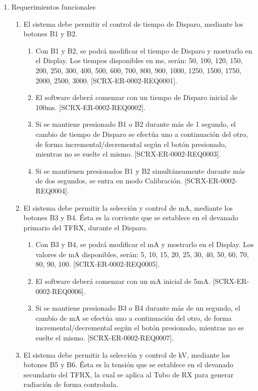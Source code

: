 \documentclass[
11pt, %
]{charter}
\begin{document}
\begin{enumerate}
	\newpage
	\item Requerimientos funcionales
		\begin{enumerate}
			\item El sistema debe permitir el control de tiempo de Disparo, mediante los botones B1 y B2.
				\begin{enumerate}
					\item Con B1 y B2, se podrá modificar el tiempo de Disparo y mostrarlo en el Display. Los tiempos disponibles en ms, serán: 50, 100, 120, 150, 200, 250, 300, 400, 500, 600, 700, 800, 900, 1000, 1250, 1500, 1750, 2000, 2500, 3000. [SCRX-ER-0002-REQ0001].
					\item El software deberá comenzar con un tiempo de Disparo inicial de 100ms. [SCRX-ER-0002-REQ0002].
					\item Si se mantiene presionado B1 o B2 durante más de 1 segundo, el cambio de tiempo de Disparo se efectúa uno a continuación del otro, de forma incremental/decremental según el botón presionado, mientras no se suelte el mismo. [SCRX-ER-0002-REQ0003].
					\item Si se mantienen presionados B1 y B2 simultáneamente durante más de dos segundos, se entra en modo Calibración. [SCRX-ER-0002-REQ0004].
				\end{enumerate}
			\item El sistema debe permitir la selección y control de mA, mediante los botones B3 y B4. Ésta es la corriente que se establece en el devanado primario del TFRX, durante el Disparo.
				\begin{enumerate}
					\item Con B3 y B4, se podrá modificar el mA y mostrarlo en el Display. Los valores de mA disponibles, serán: 5, 10, 15, 20, 25, 30, 40, 50, 60, 70, 80, 90, 100. [SCRX-ER-0002-REQ0005].
					\item El software deberá comenzar con un mA inicial de 5mA. [SCRX-ER-0002-REQ0006].
					\item Si se mantiene presionado B3 o B4 durante más de un segundo, el cambio de mA se efectúa uno a continuación del otro, de forma incremental/decremental según el botón presionado, mientras no se suelte el mismo. [SCRX-ER-0002-REQ0007].
				\end{enumerate}
			\item El sistema debe permitir la selección y control de kV, mediante los botones B5 y B6. Ésta es la tensión que se establece en el devanado secundario del TFRX, la cual se aplica al Tubo de RX para generar radiación de forma controlada.

\end{enumerate}
\end{enumerate}
\end{document}
